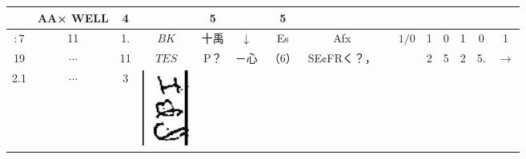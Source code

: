 \documentclass[10pt]{article}
\begin{document}
\begin{center}
\begin{tabular}{|c|c|c|c|c|c|c|c|c|c|c|c|c|c|c|}
 & AA× WELL & 4 &  & 5 &  & 5 &  \\
\hline
\(: 7\) & 11 & 1. & \(B K\) & 十禹 & \(\downarrow\) & Es & Afx &  & \(1 / 0\) & 1 & 0 & 1 & 0 & 1 \\
\hline
19 & \(\cdots\) & 11 & \(T E S\) & P？ & －心 & （6） & SE¢FRく？， &  &  & 2 & 5 & 2 & 5. & \(\rightarrow\) \\
\hline
2.1 & \(\cdots\) & 3 & \includegraphics[max width=\textwidth]{2025_02_27_dd68c3d38de88f0516d9g-009(9)}

\end{tabular}
\end{center}
\end{document}

